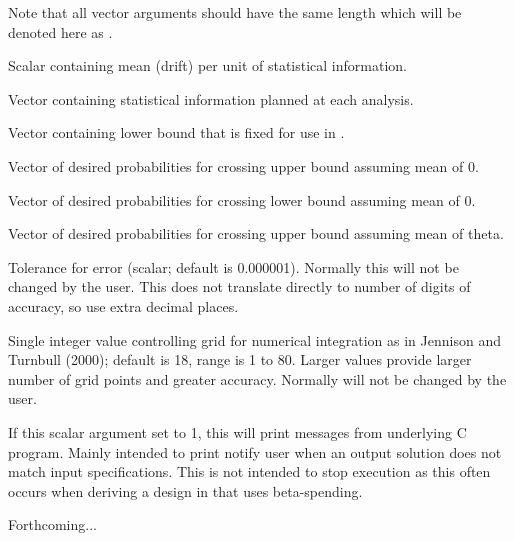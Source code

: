 \begin{Arguments}
Note that all vector arguments should have the same length which will be denoted here as .
\begin{ldescription}
\item[\code{theta}] Scalar containing mean (drift) per unit of statistical information.
\item[\code{I}] Vector containing statistical information planned at each analysis.
\item[\code{a}] Vector containing lower bound that is fixed for use in .
\item[\code{trueneg}] Vector of desired probabilities for crossing upper bound assuming mean of 0.
\item[\code{falsepos}] Vector of desired probabilities for crossing lower bound assuming mean of 0.
\item[\code{probhi}] Vector of desired probabilities for crossing upper bound assuming mean of theta.
\item[\code{tol}] Tolerance for error (scalar; default is 0.000001). Normally this will not be changed by the user.
This does not translate directly to number of digits of accuracy, so use extra decimal places.
\item[\code{r}] Single integer value controlling grid for numerical integration as in Jennison and Turnbull (2000); 
default is 18, range is 1 to 80. 
Larger values provide larger number of grid points and greater accuracy.
Normally  will not be changed by the user.
\item[\code{printerr}] If this scalar argument set to 1, this will print messages from underlying C program.
Mainly intended to print notify user when an output solution does not match input specifications.
This is not intended to stop execution as this often occurs when deriving a design in 
that uses beta-spending.
\end{ldescription}
\end{Arguments}
\begin{Details}\relax
Forthcoming...
\end{Details}
